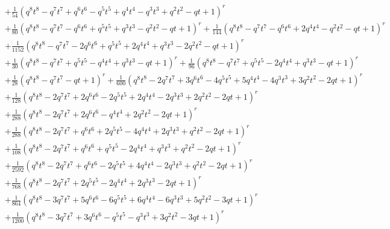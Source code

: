 \documentclass[11pt,english]{amsart}
\numberwithin{equation}{section}
\numberwithin{figure}{section}
\theoremstyle{plain}
\theoremstyle{plain}
\theoremstyle{definition}
\theoremstyle{remark}
\begin{document}
{\begin{align*}
& + \frac{1}{54}  {\left(q^{8} t^{8} - q^{7} t^{7} + q^{6} t^{6} - q^{5} t^{5} + q^{4} t^{4} - q^{3} t^{3} + q^{2} t^{2} - q t + 1\right)}^{r} \\
& + \frac{1}{80}  {\left(q^{8} t^{8} - q^{7} t^{7} - q^{6} t^{6} + q^{5} t^{5} + q^{3} t^{3} - q^{2} t^{2} - q t + 1\right)}^{r} + \frac{1}{144}  {\left(q^{8} t^{8} - q^{7} t^{7} - q^{6} t^{6} + 2  q^{4} t^{4} - q^{2} t^{2} - q t + 1\right)}^{r} \\
& + \frac{1}{1152}  {\left(q^{8} t^{8} - q^{7} t^{7} - 2  q^{6} t^{6} + q^{5} t^{5} + 2  q^{4} t^{4} + q^{3} t^{3} - 2  q^{2} t^{2} - q t + 1\right)}^{r} \\
& + \frac{1}{30}  {\left(q^{8} t^{8} - q^{7} t^{7} + q^{5} t^{5} - q^{4} t^{4} + q^{3} t^{3} - q t + 1\right)}^{r} + \frac{1}{96}  {\left(q^{8} t^{8} - q^{7} t^{7} + q^{5} t^{5} - 2  q^{4} t^{4} + q^{3} t^{3} - q t + 1\right)}^{r} \\
& + \frac{1}{28}  {\left(q^{8} t^{8} - q^{7} t^{7} - q t + 1\right)}^{r} + \frac{1}{600}  {\left(q^{8} t^{8} - 2  q^{7} t^{7} + 3  q^{6} t^{6} - 4  q^{5} t^{5} + 5  q^{4} t^{4} - 4  q^{3} t^{3} + 3  q^{2} t^{2} - 2  q t + 1\right)}^{r} \\
& + \frac{1}{128}  {\left(q^{8} t^{8} - 2  q^{7} t^{7} + 2  q^{6} t^{6} - 2  q^{5} t^{5} + 2  q^{4} t^{4} - 2  q^{3} t^{3} + 2  q^{2} t^{2} - 2  q t + 1\right)}^{r} \\
& + \frac{1}{288}  {\left(q^{8} t^{8} - 2  q^{7} t^{7} + 2  q^{6} t^{6} - q^{4} t^{4} + 2  q^{2} t^{2} - 2  q t + 1\right)}^{r} \\
& + \frac{1}{288}  {\left(q^{8} t^{8} - 2  q^{7} t^{7} + q^{6} t^{6} + 2  q^{5} t^{5} - 4  q^{4} t^{4} + 2  q^{3} t^{3} + q^{2} t^{2} - 2  q t + 1\right)}^{r} \\
& + \frac{1}{108}  {\left(q^{8} t^{8} - 2  q^{7} t^{7} + q^{6} t^{6} + q^{5} t^{5} - 2  q^{4} t^{4} + q^{3} t^{3} + q^{2} t^{2} - 2  q t + 1\right)}^{r} \\
& + \frac{1}{2592}  {\left(q^{8} t^{8} - 2  q^{7} t^{7} + q^{6} t^{6} - 2  q^{5} t^{5} + 4  q^{4} t^{4} - 2  q^{3} t^{3} + q^{2} t^{2} - 2  q t + 1\right)}^{r} \\
& + \frac{1}{768}  {\left(q^{8} t^{8} - 2  q^{7} t^{7} + 2  q^{5} t^{5} - 2  q^{4} t^{4} + 2  q^{3} t^{3} - 2  q t + 1\right)}^{r} \\
& + \frac{1}{864}  {\left(q^{8} t^{8} - 3  q^{7} t^{7} + 5  q^{6} t^{6} - 6  q^{5} t^{5} + 6  q^{4} t^{4} - 6  q^{3} t^{3} + 5  q^{2} t^{2} - 3  q t + 1\right)}^{r} \\
& + \frac{1}{1200}  {\left(q^{8} t^{8} - 3  q^{7} t^{7} + 3  q^{6} t^{6} - q^{5} t^{5} - q^{3} t^{3} + 3  q^{2} t^{2} - 3  q t + 1\right)}^{r} \\

\end{align*}}
\end{document}
